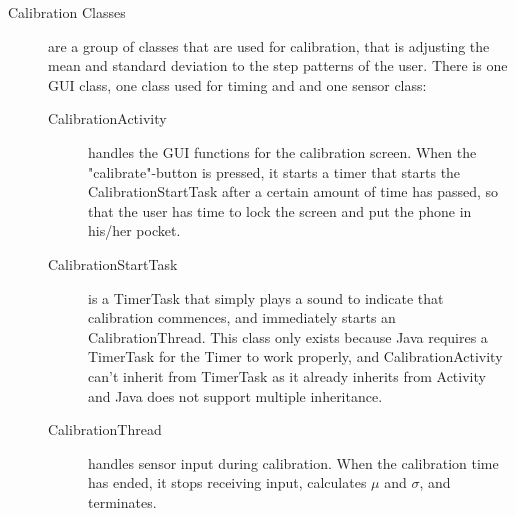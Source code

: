\begin{description}
\item[Calibration Classes]
are a group of classes that are used for calibration, that is adjusting the mean and standard deviation to the step patterns of the user. There is one GUI class, one class used for timing and and one sensor class:
\begin{description}
\item[CalibrationActivity]
handles the GUI functions for the calibration screen. When the "calibrate"-button is pressed, it starts a timer that starts the CalibrationStartTask after a certain amount of time has passed, so that the user has time to lock the screen and put the phone in his/her pocket.
\item[CalibrationStartTask]
is a TimerTask that simply plays a sound to indicate that calibration commences, and immediately starts an CalibrationThread. This class only exists because Java requires a TimerTask for the Timer to work properly, and CalibrationActivity can't inherit from TimerTask as it already inherits from Activity and Java does not support multiple inheritance. 
\item[CalibrationThread]
handles sensor input during calibration. When the calibration time has ended, it stops receiving input, calculates $\mu$ and $\sigma$, and terminates.
\end{description}
 
\end{description}

